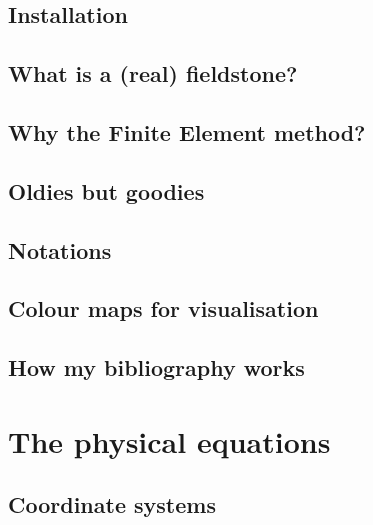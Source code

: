 \documentclass[a4paper]{article}
\begin{document}
\subsection{Installation}  %
\subsection{What is a (real) fieldstone?}  %
\subsection{Why the Finite Element method?}  %
\subsection{Oldies but goodies}  %
\subsection{Notations}  %
\subsection{Colour maps for visualisation}  %
\subsection{How my bibliography works}  %


\newpage
\section{The physical equations} %
\subsection{Coordinate systems}  \label{ss:coordsys} %
\end{document}
